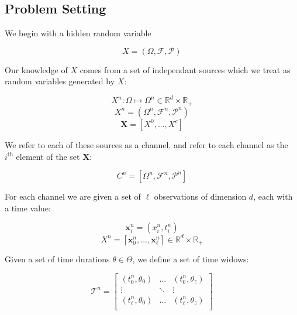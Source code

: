 \documentclass[10pt]{article}
\begin{document}


\subsection{Problem Setting}
We begin with a hidden random variable 

\[ X = (\Omega,\mathcal{F},\mathcal{P}) \]

Our knowledge of \( X \) comes from a set of independant sources which we treat as random variables generated by \( X \):

\[ X^n : \Omega \mapsto \Omega^n \in \mathbb{R}^d \times \mathbb{R}_+  \]
\[ X^n = (\Omega^n,\mathcal{F}^n,\mathcal{P}^n) \]
\[ \mathbf{X} = [X^0,...,X^c]   \]

We refer to each of these sources as a channel, and refer to each channel as the \( i^\text{th} \) element of the set \( \mathbf{X} \):

\[ C^n = [\Omega^n,\mathcal{F}^n,\mathcal{P}^n] \]

For each channel we are given a set of \( \ell \) observations of dimension \( d \), each with a time value:

\[ \mathbf{x}_i^n = (x_i^n, t_i^n ) \]
\[ X^n = \left[ \mathbf{x}_0^n,\hdots,\mathbf{x}_\ell^n \right] \in \mathbb{R}^d \times \mathbb{R}_+ \]

Given a set of time durations \( \theta \in \Theta \), we define a set of time widows:

\[  \mathcal{T}^n =  
\begin{bmatrix} 
(t_0^n,\theta_0) & \hdots & (t_0^n,\theta_z) \\
\vdots & \ddots & \vdots \\
(t_\ell^n, \theta_0) & \hdots & (t_\ell^n, \theta_z) \\
\end{bmatrix} 
\]
\end{document}
